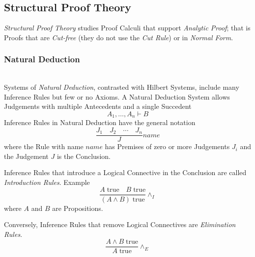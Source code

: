 \documentclass{article}
\begin{document}
\subsection{Structural Proof Theory}

\emph{Structural Proof Theory} studies Proof Calculi that support
\emph{Analytic Proof}; that is Proofs that are \emph{Cut-free} (they
do not use the \emph{Cut Rule}) or in \emph{Normal Form}.

\subsubsection{Natural Deduction}\label{subsec:natural_deduction} \hfill
\\
Systems of \emph{Natural Deduction}\cite{prawitz65}, contrasted with
Hilbert Systems, include many Inference Rules but few or no Axioms. A
Natural Deduction System allows Judgements with multiple Antecedents
and a single Succedent
\[
    A_1,\ldots,A_n \vdash B
\]
Inference Rules in Natural Deduction have the general notation
\[
    {
        \frac{J_1 \quad J_2 \quad \cdots \quad J_n}
        {J}
    } name
\]
where the Rule with name $name$ has Premises of zero or more
Judgements $J_i$ and the Judgement $J$ is the Conclusion.

Inference Rules that introduce a Logical Connective in the Conclusion
are called \emph{Introduction Rules}. Example
\[
    {
        \frac{A\;\mathrm{true} \quad B\;\mathrm{true}}
        {(A \wedge B)\;\mathrm{true}}
    } \wedge_I
\]
where $A$ and $B$ are Propositions.

Conversely, Inference Rules that remove Logical Connectives are
\emph{Elimination Rules}.
\[
    {
        \frac{A \wedge B\;\mathrm{true}}
        {A\;\mathrm{true}}
    } \wedge_E
\]
\end{document}
